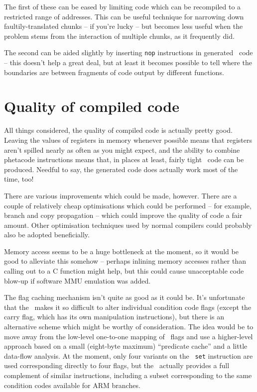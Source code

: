 The first of these can be eased by limiting code which can be recompiled to a restricted range of addresses. This can be useful technique for narrowing down faultily-translated chunks -- if you're lucky -- but becomes less useful when the problem stems from the interaction of multiple chunks, as it frequently did.

The second can be aided slightly by inserting {\tt nop} instructions in generated \ia\ code -- this doesn't help a great deal, but at least it becomes possible to tell where the boundaries are between fragments of code output by different functions.

\section{Quality of compiled code}

All things considered, the quality of compiled code is actually pretty good. Leaving the values of registers in memory whenever possible means that registers aren't spilled nearly as often as you might expect, and the ability to combine phetacode instructions means that, in places at least, fairly tight \ia\ code can be produced. Needful to say, the generated code does actually work most of the time, too!

There are various improvements which could be made, however. There are a couple of relatively cheap optimisations which could be performed -- for example, branch and copy propagation -- which could improve the quality of code a fair amount. Other optimisation techniques used by normal compilers could probably also be adopted beneficially.

Memory access seems to be a huge bottleneck at the moment, so it would be good to alleviate this somehow -- perhaps inlining memory accesses rather than calling out to a C function might help, but this could cause unacceptable code blow-up if software MMU emulation was added.

The flag caching mechanism isn't quite as good as it could be. It's unfortunate that the \ia\ makes it so difficult to alter individual condition code flags (except the carry flag, which has its own manipulation instructions), but there is an alternative scheme which might be worthy of consideration. The idea would be to move away from the low-level one-to-one mapping of \arm\ flags and use a higher-level approach based on a small (eight-byte maximum) ``predicate cache'' and a little data-flow analysis. At the moment, only four variants on the \ia\ {\tt set} instruction are used corresponding directly to four flags, but the \ia\ actually provides a full complement of similar instructions, including a subset corresponding to the same condition codes available for ARM branches.

